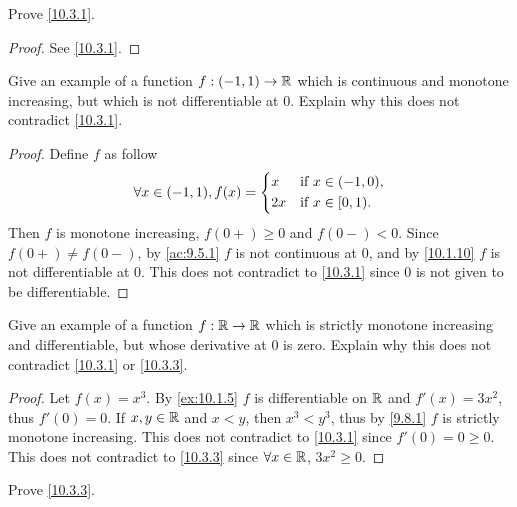 \exercisesection

\begin{ex}\label{ex:10.3.1}
  Prove \cref{10.3.1}.
\end{ex}

\begin{proof}
  See \cref{10.3.1}.
\end{proof}

\begin{ex}\label{ex:10.3.2}
  Give an example of a function \(f : (-1, 1) \to \mathbb{R}\) which is continuous and monotone increasing, but which is not differentiable at \(0\).
  Explain why this does not contradict \cref{10.3.1}.
\end{ex}

\begin{proof}
  Define \(f\) as follow
  \[
    \forall x \in (-1, 1), f(x) = \begin{dcases}
      x  & \text{if } x \in (-1, 0), \\
      2x & \text{if } x \in [0, 1).
    \end{dcases}
  \]
  Then \(f\) is monotone increasing, \(f(0+) \geq 0\) and \(f(0-) < 0\).
  Since \(f(0+) \neq f(0-)\), by \cref{ac:9.5.1} \(f\) is not continuous at \(0\), and by \cref{10.1.10} \(f\) is not differentiable at \(0\).
  This does not contradict to \cref{10.3.1} since \(0\) is not given to be differentiable.
\end{proof}

\begin{ex}\label{ex:10.3.3}
  Give an example of a function \(f : \mathbb{R} \to \mathbb{R}\) which is strictly monotone increasing and differentiable, but whose derivative at \(0\) is zero.
  Explain why this does not contradict \cref{10.3.1} or \cref{10.3.3}.
\end{ex}

\begin{proof}
  Let \(f(x) = x^3\).
  By \cref{ex:10.1.5} \(f\) is differentiable on \(\mathbb{R}\) and \(f'(x) = 3x^2\), thus \(f'(0) = 0\).
  If \(x, y \in \mathbb{R}\) and \(x < y\), then \(x^3 < y^3\), thus by \cref{9.8.1} \(f\) is strictly monotone increasing.
  This does not contradict to \cref{10.3.1} since \(f'(0) = 0 \geq 0\).
  This does not contradict to \cref{10.3.3} since \(\forall x \in \mathbb{R}\), \(3x^2 \geq 0\).
\end{proof}

\begin{ex}\label{ex:10.3.4}
  Prove \cref{10.3.3}.
\end{ex}

